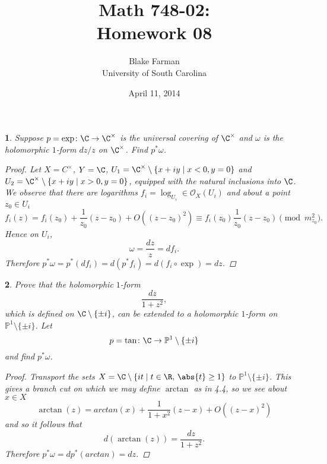 \documentclass[10pt]{amsart}
\author{Blake Farman\\University of South Carolina}
\title{Math 748-02:\\Homework 08}
\date{April 11, 2014}
\begin{document}
\maketitle

\providecommand{\p}{\mathfrak{p}}
\providecommand{\m}{\mathfrak{m}}
\providecommand{\Deck}[1]{\operatorname{Deck}\left(#1\right)}

\newtheorem{thm}{}
\newtheorem{lem}{Lemma}
\newtheorem{prop}{Proposition}
\theoremstyle{definition}
\newtheorem{defn}{Definition}[thm]

\newcommand{\A}{\mathbb{A}}

\begin{thm}
  Suppose $p = \exp \colon \C \rightarrow \C^\times$ is the universal covering of $\C^\times$ and $\omega$ is the holomorphic $1$-form $dz/z$ on $\C^\times$.
  Find $p^*\omega$.
  
  \begin{proof}
    Let $X = C^\times$, $Y = \C$, $U_1 = \C^\times \setminus \left\{x + iy \;\middle\vert\; x < 0, y = 0\right\}$ and $U_2 = \C^\times \setminus \left\{x + iy \;\middle\vert\; x > 0, y = 0\right\}$, 
    equipped with the natural inclusions into $\C$.
    We observe that there are logarithms $f_i = \log_{U_i} \in \mathcal{O}_X(U_i)$ and about a point $z_0 \in U_i$
    $$f_i(z) = f_i(z_0) + \frac{1}{z_0}(z - z_0) + O((z - z_0)^2) \equiv f_i(z_0) \frac{1}{z_0}(z - z_0) \pmod{m_{z_0}^2}.$$
    Hence on $U_i$,
    $$\omega = \frac{dz}{z} = df_i.$$
    Therefore $p^*\omega = p^*(df_i) = d(p^*f_i) = d(f_i \circ \exp) = dz$.
  \end{proof}
\end{thm}

\begin{thm}
  Prove that the holomorphic $1$-form
  $$\frac{dz}{1 + z^2},$$
  which is defined on $\C\setminus\{\pm i\}$, can be extended to a holomorphic $1$-form on $\mathbb{P}^1\setminus \{\pm i\}$.
  Let
  $$p = \tan \colon \C \rightarrow \mathbb{P}^1\setminus\{\pm i\}$$
  and find $p^*\omega$.
  
  \begin{proof}
    Transport the sets $X = \C \setminus \left\{it \;\middle\vert\; t \in \R,\, \abs{t} \geq 1\right\}$ to $\mathbb{P}^1\setminus\{\pm i\}$.
    This gives a branch cut on which we may define $\arctan$ as in 4.4, so we see about $x \in X$ 
    $$\arctan(z) = arctan(x) + \frac{1}{1 + x^2}(z - x) + O((z - x)^2)$$
    and so it follows that 
    $$d(\arctan(z)) = \frac{dz}{1 + z^2}.$$
    Therefore $p^*\omega = dp^*(arctan) = dz$.
  \end{proof}
\end{thm}
\end{document}
